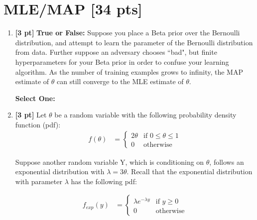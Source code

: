 \documentclass[12pt]{article}
\renewcommand{\circle}{\tikz\draw[black] (0,0) circle (1ex);}
\begin{document}
\section{MLE/MAP [34 pts]}
\begin{enumerate}

    \item \textbf{[3 pt]} \textbf{True or False:} Suppose you place a Beta prior over the Bernoulli distribution, and attempt to learn the parameter of the Bernoulli distribution from data. Further suppose an adversary chooses ``bad", but finite hyperparameters for your Beta prior in order to confuse your learning algorithm. As the number of training examples grows to infinity, the MAP estimate of $\theta$ can still converge to the MLE estimate of $\theta$.
    
    \textbf{Select One:}
    
    
    
    \item \textbf{[3 pt]} Let $\theta$ be a random variable with the following probability density function (pdf): 
    \begin{align*}
        f(\theta) &= 
        \begin{cases}
        2\theta  & \text{if } 0 \leq \theta \leq 1 \\
        0  & \text{otherwise}
        \end{cases}
    \end{align*}
    
    Suppose another random variable Y, which is conditioning on $\theta$, follows an exponential distribution with  $\lambda=3\theta$. Recall that the exponential distribution with parameter $\lambda$ has the following pdf:
    
    
    \begin{align*}
        f_{exp}(y) &= 
        \begin{cases}
        \lambda e^{-\lambda y}  & \text{if } y\geq 0 \\
        0  & \text{otherwise}
        \end{cases}
    \end{align*}
    

\end{enumerate}
\end{document}
